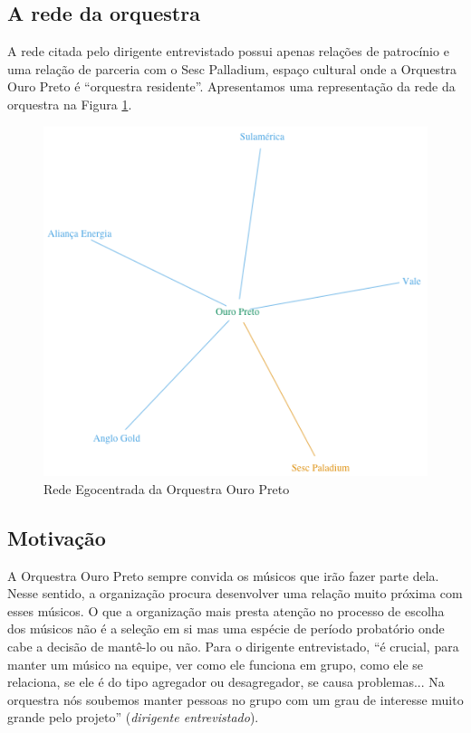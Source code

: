 \documentclass[a4paper, 12pt, openright, oneside, german, french, english, brazil]{abntex2}
\begin{document}
	\subsection{A rede da orquestra}
	
	A rede citada pelo dirigente entrevistado possui apenas relações de patrocínio e uma relação de parceria com o Sesc Palladium, espaço cultural onde a Orquestra Ouro Preto é ``orquestra residente''. Apresentamos uma representação da rede da orquestra na Figura \ref{rede-ouropreto}.
	
	\begin{figure}[!ht]
		\centering
		\caption{Rede Egocentrada da Orquestra Ouro Preto}
		\label{rede-ouropreto}
		\includegraphics[scale=.7]{rede_ouropreto.png}
	\end{figure}
	
	
	\subsection{Motivação}
	
	A Orquestra Ouro Preto sempre convida os músicos que irão fazer parte dela. Nesse sentido, a organização procura desenvolver uma relação muito próxima com esses músicos. O que a organização mais presta atenção no processo de escolha dos músicos não é a seleção em si mas uma espécie de período probatório onde cabe a decisão de mantê-lo ou não. Para o dirigente entrevistado, ``é crucial, para manter um músico na equipe, ver como ele funciona em grupo, como ele se relaciona, se ele é do tipo agregador ou desagregador, se causa problemas... Na orquestra nós soubemos manter pessoas no grupo com um grau de interesse muito grande pelo projeto'' (\textit{dirigente entrevistado}).
	
\end{document}
